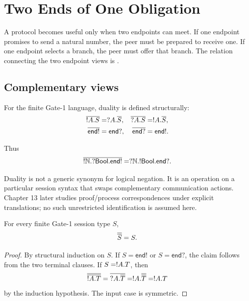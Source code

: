 
\chapter{Two Ends of One Obligation}

A protocol becomes useful only when two endpoints can meet. If one endpoint promises to send a
natural number, the peer must be prepared to receive one. If one endpoint selects a branch, the
peer must offer that branch. The relation connecting the two endpoint views is
.

\section{Complementary views}

For the finite Gate-1 language, duality is defined structurally:
\[
\begin{aligned}
 \overline{!A.S} &= ?A.\overline{S}, &
 \overline{?A.S} &= !A.\overline{S},\\
 \overline{\mathsf{end!}} &= \mathsf{end?}, &
 \overline{\mathsf{end?}} &= \mathsf{end!}.
\end{aligned}
\]

Thus
\[
 \overline{!\mathbb{N}.?\mathsf{Bool}.\mathsf{end!}}
 =
 ?\mathbb{N}.!\mathsf{Bool}.\mathsf{end?}.
\]



\begin{warningbox}
Duality is not a generic synonym for logical negation. It is an operation on a particular session
syntax that swaps complementary communication actions. Chapter 13 later studies proof/process
correspondences under explicit translations; no such unrestricted identification is assumed here.
\end{warningbox}

\begin{theorem}
For every finite Gate-1 session type \(S\),
\[
  \overline{\overline{S}}=S.
\]
\end{theorem}

\begin{proof}
By structural induction on \(S\). If \(S=\mathsf{end!}\) or
\(S=\mathsf{end?}\), the claim follows from the two terminal clauses. If
\(S=!A.T\), then
\[
  \overline{\overline{!A.T}}
  =\overline{?A.\overline{T}}
  =!A.\overline{\overline{T}}
  =!A.T
\]
by the induction hypothesis. The input case is symmetric.
\end{proof}

